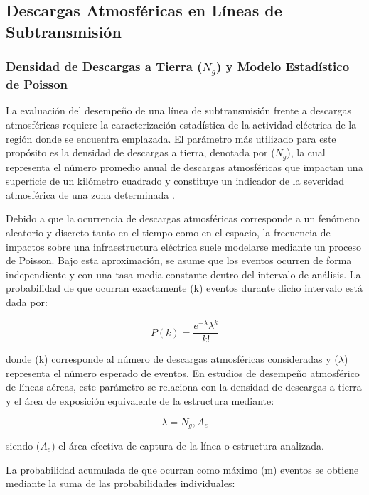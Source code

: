 \documentclass[12pt,letterpaper]{article}
\begin{document}
\subsection{Descargas Atmosféricas en Líneas de Subtransmisión}


\subsubsection{Densidad de Descargas a Tierra ($N_g$) y Modelo Estadístico de Poisson}
La evaluación del desempeño de una línea de subtransmisión frente a descargas atmosféricas requiere la caracterización estadística de la actividad eléctrica de la región donde se encuentra emplazada. El parámetro más utilizado para este propósito es la densidad de descargas a tierra, denotada por ($N_g$), la cual representa el número promedio anual de descargas atmosféricas que impactan una superficie de un kilómetro cuadrado y constituye un indicador de la severidad atmosférica de una zona determinada \cite{ieee1410}.

Debido a que la ocurrencia de descargas atmosféricas corresponde a un fenómeno aleatorio y discreto tanto en el tiempo como en el espacio, la frecuencia de impactos sobre una infraestructura eléctrica suele modelarse mediante un proceso de Poisson. Bajo esta aproximación, se asume que los eventos ocurren de forma independiente y con una tasa media constante dentro del intervalo de análisis. La probabilidad de que ocurran exactamente (k) eventos durante dicho intervalo está dada por:

\begin{equation}
P(k)=\frac{e^{-\lambda}\lambda^k}{k!}
\label{eq:poisson}
\end{equation}

donde (k) corresponde al número de descargas atmosféricas consideradas y ($\lambda$) representa el número esperado de eventos. En estudios de desempeño atmosférico de líneas aéreas, este parámetro se relaciona con la densidad de descargas a tierra y el área de exposición equivalente de la estructura mediante:

\begin{equation}
\lambda=N_g,A_e
\label{eq:lambda}
\end{equation}

siendo ($A_e$) el área efectiva de captura de la línea o estructura analizada.

La probabilidad acumulada de que ocurran como máximo (m) eventos se obtiene mediante la suma de las probabilidades individuales:
\end{document}
